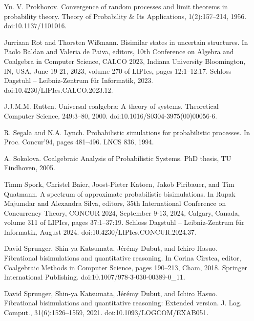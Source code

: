 \documentclass[10pt,a4paper]{article}
\begin{document}
\par\noindent  [45]  Yu. V. Prokhorov.  Convergence of random processes and limit theorems in probability theory.  Theory of Probability \& Its Applications, 1(2):157–214, 1956.  doi:10.1137/1101016.  
 
\par\noindent  [46]  Jurriaan Rot and Thorsten Wißmann.  Bisimilar states in uncertain structures.  In Paolo Baldan and Valeria de Paiva, editors, 10th Conference on Algebra and Coalgebra in Computer Science, CALCO 2023, Indiana University Bloomington, IN, USA, June 19-21, 2023, volume 270 of LIPIcs, pages 12:1–12:17. Schloss Dagstuhl – Leibniz-Zentrum für Informatik, 2023.  doi:10.4230/LIPIcs.CALCO.2023.12.  
 
\par\noindent  [47]  J.J.M.M. Rutten.  Universal coalgebra: A theory of systems.  Theoretical Computer Science, 249:3–80, 2000.  doi:10.1016/S0304-3975(00)00056-6.  
 
\par\noindent  [48]  R. Segala and N.A. Lynch.  Probabilistic simulations for probabilistic processes.  In Proc. Concur’94, pages 481–496. LNCS 836, 1994.  
 
\par\noindent  [49]  A. Sokolova.  Coalgebraic Analysis of Probabilistic Systems.  PhD thesis, TU Eindhoven, 2005.  
 
\par\noindent  [50]  Timm Spork, Christel Baier, Joost-Pieter Katoen, Jakob Piribauer, and Tim Quatmann.  A spectrum of approximate probabilistic bisimulations.  In Rupak Majumdar and Alexandra Silva, editors, 35th International Conference on Concurrency Theory, CONCUR 2024, September 9-13, 2024, Calgary, Canada, volume 311 of LIPIcs, pages 37:1–37:19. Schloss Dagstuhl – Leibniz-Zentrum für Informatik, August 2024.  doi:10.4230/LIPIcs.CONCUR.2024.37.  
 
\par\noindent  [51]  David Sprunger, Shin-ya Katsumata, Jérémy Dubut, and Ichiro Hasuo.  Fibrational bisimulations and quantitative reasoning.  In Corina Cîrstea, editor, Coalgebraic Methods in Computer Science, pages 190–213, Cham, 2018. Springer International Publishing.  doi:10.1007/978-3-030-00389-0\_11.  
 
\par\noindent  [52]  David Sprunger, Shin-ya Katsumata, Jérémy Dubut, and Ichiro Hasuo.  Fibrational bisimulations and quantitative reasoning: Extended version.  J. Log. Comput., 31(6):1526–1559, 2021.  doi:10.1093/LOGCOM/EXAB051.  
 
\end{document}
